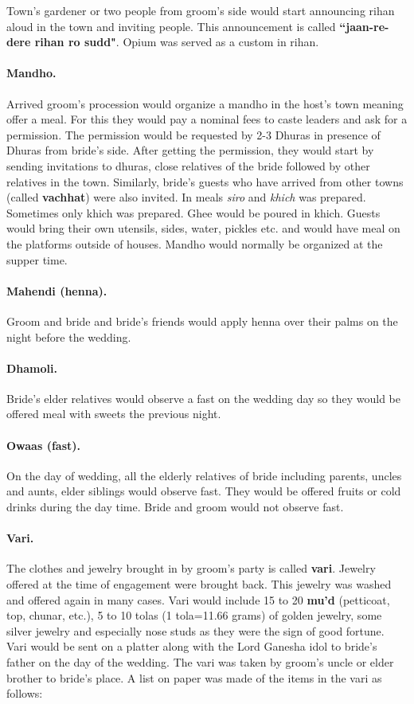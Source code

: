 Town's gardener or two people from groom's side would start announcing rihan
aloud in the town and inviting people. This announcement is called
\textbf{``jaan-re-dere rihan ro sudd"}. Opium was served as a custom in rihan.

\paragraph{Mandho.} Arrived groom's procession would organize a mandho in the
host's town meaning offer a meal. For this they would pay a nominal fees to
caste leaders and ask for a permission. The permission would be requested by
2-3 Dhuras in presence of Dhuras from bride's side. After getting the
permission, they would start by sending invitations to dhuras, close relatives
of the bride followed by other relatives in the town. Similarly, bride's guests
who have arrived from other towns (called \textbf{vachhat}) were also invited.
In meals \textit{siro} and \textit{khich} was prepared. Sometimes only khich
was prepared. Ghee would be poured in khich. Guests would bring their own
utensils, sides, water, pickles etc. and would have meal on the platforms
outside of houses. Mandho would normally be organized at the supper time.

\paragraph{Mahendi (henna).} Groom and bride and bride's friends would apply
henna over their palms on the night before the wedding.

\paragraph{Dhamoli.} Bride's elder relatives would observe a fast on the
wedding day so they would be offered meal with sweets the previous night.

\paragraph{Owaas (fast).} On the day of wedding, all the elderly relatives of
bride including parents, uncles and aunts, elder siblings would observe fast.
They would be offered fruits or cold drinks during the day time. Bride and
groom would not observe fast.

\paragraph{Vari.} The clothes and jewelry brought in by groom's party is called
\textbf{vari}. Jewelry offered at the time of engagement were brought back.
This jewelry was washed and offered again in many cases. Vari would include 15
to 20 \textbf{mu'd} (petticoat, top, chunar, etc.), 5 to 10 tolas (1 tola=11.66
grams) of golden jewelry, some silver jewelry and especially nose studs as they
were the sign of good fortune. Vari would be sent on a platter along with the
Lord Ganesha idol to bride's father on the day of the wedding. The vari was
taken by groom's uncle or elder brother to bride's place. A list on paper was
made of the items in the vari as follows:

